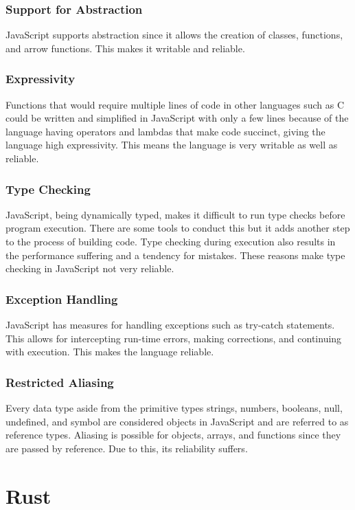 \documentclass{article}
\begin{document}
  \subsubsection{Support for Abstraction}
  JavaScript supports abstraction since it allows the creation of classes,
  functions, and arrow functions. This makes it writable and reliable.

  \subsubsection{Expressivity}
  Functions that would require multiple lines of code in other languages such as
  C could be written and simplified in JavaScript with only a few lines because
  of the language having operators and lambdas that make code succinct, giving the 
  language high expressivity. This means the language is very writable as well as
  reliable.

  \subsubsection{Type Checking}
  JavaScript, being dynamically typed, makes it difficult to run type checks
  before program execution. There are some tools to conduct this but it adds
  another step to the process of building code. Type checking during execution
  also results in the performance suffering and a tendency for mistakes. These
  reasons make type checking in JavaScript not very reliable.

  \subsubsection{Exception Handling}
  JavaScript has measures for handling exceptions such as try-catch statements.
  This allows for intercepting run-time errors, making corrections, and
  continuing with execution. This makes the language reliable.

  \subsubsection{Restricted Aliasing}
  Every data type aside from the primitive types strings, numbers, booleans,
  null, undefined, and symbol are considered objects in JavaScript and are
  referred to as reference types. Aliasing is possible for objects, arrays, and
  functions since they are passed by reference. Due to this, its reliability
  suffers.

  \section{Rust}
\end{document}
